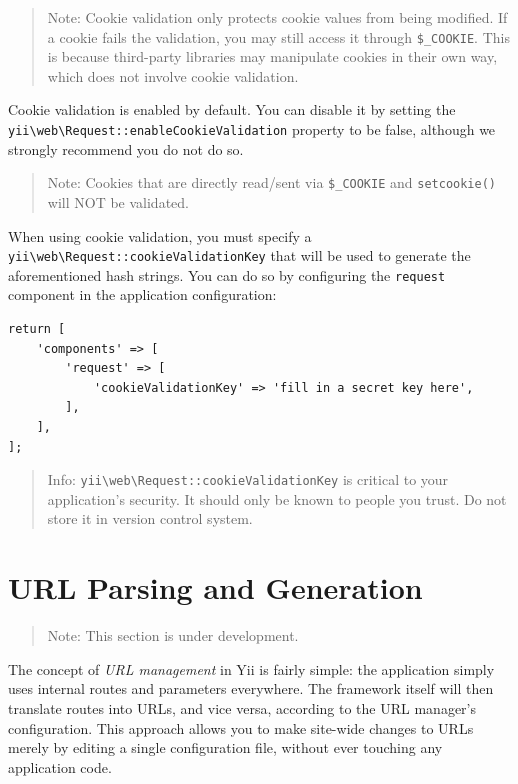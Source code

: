 \begin{quote}Note: Cookie validation only protects cookie values from being modified. If a cookie fails the validation, 
you may still access it through \lstinline|$_COOKIE|. This is because third-party libraries may manipulate cookies 
in their own way, which does not involve cookie validation.

\end{quote}
Cookie validation is enabled by default. You can disable it by setting the \texttt{yii{\allowbreak{}\textbackslash}web{\allowbreak{}\textbackslash}Request\allowbreak{}::\allowbreak{}enableCookieValidation}
property to be false, although we strongly recommend you do not do so.

\begin{quote}Note: Cookies that are directly read/sent via \lstinline|$_COOKIE| and \lstinline|setcookie()| will NOT be validated.

\end{quote}
When using cookie validation, you must specify a \texttt{yii{\allowbreak{}\textbackslash}web{\allowbreak{}\textbackslash}Request\allowbreak{}::\allowbreak{}cookieValidationKey} that will be used to generate
the aforementioned hash strings. You can do so by configuring the \lstinline|request| component in the application configuration:

\lstset{language=php}\begin{lstlisting}
return [
    'components' => [
        'request' => [
            'cookieValidationKey' => 'fill in a secret key here',
        ],
    ],
];
\end{lstlisting}
\begin{quote}Info: \texttt{yii{\allowbreak{}\textbackslash}web{\allowbreak{}\textbackslash}Request\allowbreak{}::\allowbreak{}cookieValidationKey} is critical to your application's security.
  It should only be known to people you trust. Do not store it in version control system.

\end{quote}


\label{runtime-url-handling.md}\section{URL Parsing and Generation}
\begin{quote}Note: This section is under development.

\end{quote}
The concept of \textit{URL management} in Yii is fairly simple: the application simply uses internal routes and parameters everywhere. The framework itself will then translate routes into URLs, and vice versa, according to the URL manager's configuration. This approach allows you to make site-wide changes to URLs merely by
editing a single configuration file, without ever touching any application code.

